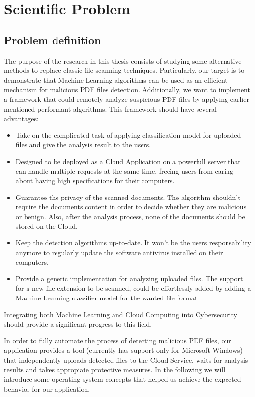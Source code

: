 \chapter{Scientific Problem}
\label{section:scientificProblem}

\section{Problem definition}
\label{section:problemDefinition}
The purpose of the research in this thesis consists of studying some alternative methods to replace classic file scanning techniques. Particularly, our target is to demonstrate that Machine Learning algorithms can be used as an efficient mechanism for malicious PDF files detection. Additionally, we want to implement a framework that could remotely analyze suspicious PDF files by applying earlier mentioned performant algorithms. This framework should have several advantages: 
\begin{itemize}
    \item Take on the complicated task of applying classification model for uploaded files and give the analysis result to the users.
    \item Designed to be deployed as a Cloud Application on a powerfull server that can handle multiple requests at the same time, freeing users from caring about having high specifications for their computers.
    \item Guarantee the privacy of the scanned documents. The algorithm shouldn't require the documents content in order to decide whether they are malicious or benign. Also, after the analysis process, none of the documents should be stored on the Cloud.
    \item Keep the detection algorithms up-to-date. It won't be the users responsability anymore to regularly update the software antivirus installed on their computers. 
    \item Provide a generic implementation for analyzing uploaded files. The support for a new file extension to be scanned, could be effortlessly added by adding a Machine Learning classifier model for the wanted file format.
\end{itemize}
Integrating both Machine Learning and Cloud Computing into Cybersecurity should provide a significant progress to this field. \par

In order to fully automate the process of detecting malicious PDF files, our application provides a tool (currently has support only for Microsoft Windows) that independently uploads detected files to the Cloud Service, waits for analysis results and takes appropiate protective measures. In the following we will introduce some operating system concepts that helped us achieve the expected behavior for our application.

